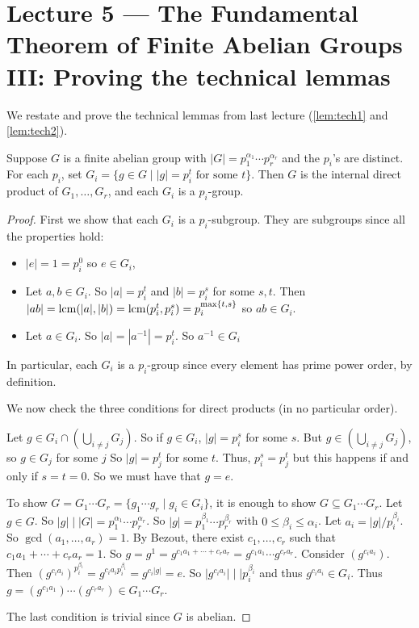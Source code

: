 \section{Lecture 5 — The Fundamental Theorem of Finite Abelian Groups III: Proving the technical lemmas}

We restate and prove the technical lemmas from last lecture (\ref{lem:tech1} and \ref{lem:tech2}).
\begin{lemma}
	Suppose $G$ is a finite abelian group with $|G|=p_1^{\alpha_1}\cdots p_r^{\alpha_r}$ and the $p_i$'s are distinct. For each $p_i$, set $G_i=\{g\in G\mid |g|=p_i^t\text{ for some }t\}$. Then $G$ is the internal direct product of $G_1,\hdots,G_r$, and each $G_i$ is a $p_i$-group.
\end{lemma}

\begin{proof}
	First we show that each $G_i$ is a $p_i$-subgroup. They are subgroups since all the properties hold:
	\begin{itemize}
		\item $|e|=1=p_i^0$ so $e\in G_i$,
		\item Let $a,b\in G_i$. So $|a|=p_i^t$ and $|b|=p_i^s$ for some $s,t$. Then $|ab|=\operatorname{lcm}(|a|,|b|)=\operatorname{lcm}(p_i^t,p_i^s)=p_i^{\max\{t,s\}}$ so $ab\in G_i$.
		\item Let $a\in G_i$. So $|a|=|a^{-1}|=p_i^t$. So $a^{-1}\in G_i$
	\end{itemize}
	In particular, each $G_i$ is a $p_i$-group since every element has prime power order, by definition.

	We now check the three conditions for direct products (in no particular order).

	Let $g\in G_i\cap\left(\bigcup_{i\neq j}G_j\right)$. So if $g\in G_i$, $|g|=p_i^s$ for some $s$. But $g\in \left(\bigcup_{i\neq j}G_j\right)$, so $g\in G_j$ for some $j$ So $|g|=p_j^t$ for some $t$. Thus, $p_i^s=p_j^t$ but this happens if and only if $s=t=0$. So we must have that $g=e$.

	To show $G=G_1\cdots G_r=\{g_1\cdots g_r\mid g_i\in G_i\}$, it is enough to show $G\subseteq G_1\cdots G_r$. Let $g\in G$. So $|g|\mid|G|=p_1^{\alpha_1}\cdots p_r^{\alpha_r}$. So $|g|=p_1^{\beta_1}\cdots p_r^{\beta_r}$ with $0\leq\beta_i\leq\alpha_i$. Let $a_i=|g|/p_i^{\beta_i}$. So $\gcd(a_1,\hdots,a_r)=1$. By Bezout, there exist $c_1,\hdots,c_r$ such that $c_1a_1+\cdots+c_ra_r=1$. So $g=g^1=g^{c_1a_1+\cdots+c_ra_r}=g^{c_1a_1}\cdots g^{c_ra_r}$. Consider $(g^{c_ia_i})$. Then $(g^{c_ia_i})^{p_i^{\beta_i}}=g^{c_ia_ip_i^{\beta_i}}=g^{c_i|g|}=e$. So $|g^{c_ia_i}|\mid | p_i^{\beta_i}$ and thus $g^{c_ia_i}\in G_i$. Thus $g=(g^{c_1a_1})\cdots(g^{c_ra_r})\in G_1\cdots G_r$.

	The last condition is trivial since $G$ is abelian.
\end{proof}


